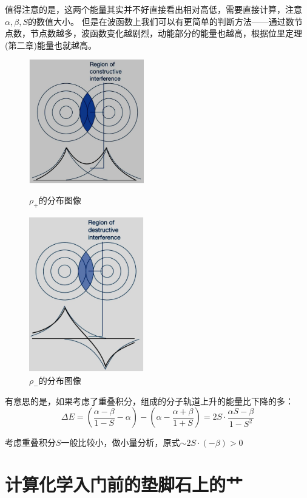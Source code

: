 值得注意的是，这两个能量其实并不好直接看出相对高低，需要直接计算，注意$\alpha,\beta,S$的数值大小。
但是在波函数上我们可以有更简单的判断方法——通过数节点数，节点数越多，波函数变化越剧烈，动能部分的能量也越高，根据位里定理(第二章)能量也就越高。

\begin{figure}[htbp]
    \centering
    \begin{minipage}[t]{0.48\textwidth}
    \centering
    \includegraphics[width=5cm]{fig/lzhx/微信图片_20211102112346.png}
    \caption{$\rho_+$的分布图像}
    \end{minipage}
    \begin{minipage}[t]{0.48\textwidth}
    \centering
    \includegraphics[width=5cm]{fig/lzhx/微信图片_202111021123461.png}
    \caption{$\rho_-$的分布图像}
    \end{minipage}
\end{figure}

有意思的是，如果考虑了重叠积分，组成的分子轨道上升的能量比下降的多：
\[\Delta E=\left(\frac{\alpha-\beta}{1-S}-\alpha\right)-\left(\alpha-\frac{\alpha+\beta}{1+S}\right)=2S \cdot \frac{\alpha S-\beta}{1-S^2}\]

考虑重叠积分$S$一般比较小，做小量分析，原式$\sim 2S \cdot (-\beta)>0$

\section{计算化学入门前的垫脚石上的艹}
